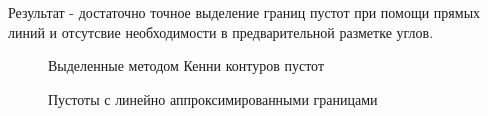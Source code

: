 \documentclass[a4paper, 14pt]{article}
\begin{document}
Результат - достаточно точное выделение границ пустот при помощи прямых линий и отсутсвие необходимости в предварительной разметке углов.

\begin{figure}[h]
	\begin{center}
		\begin{minipage}[h]{0.4\linewidth}
			\caption{Выделенные методом Кенни контуров пустот}
			\label{fig:canny}
		\end{minipage}
		\hfill
		\begin{minipage}[h]{0.5\linewidth}
			\caption{Пустоты с линейно аппроксимированными границами}
			\label{fig:find_contour}
		\end{minipage}
	\end{center}
\end{figure}
\end{document}
